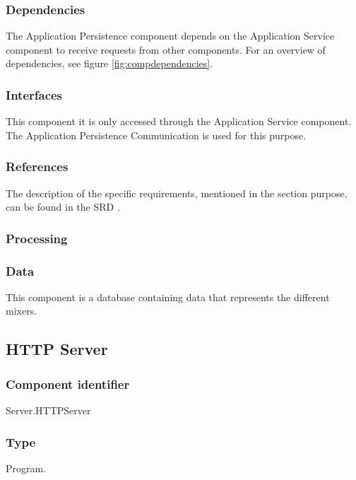 \subsubsection*{Dependencies}
The Application Persistence component depends on the Application Service component to receive requests from other components. For an overview of dependencies, see figure \ref{fig:compdependencies}.

\subsubsection*{Interfaces}
This component it is only accessed through the Application Service component. The Application Persistence Communication is used for this purpose.  

\subsubsection*{References}
The description of the specific requirements, mentioned in the section purpose, can be found in the SRD \cite{srd}.

\subsubsection*{Processing}

\subsubsection*{Data}
This component is a database containing data that represents the different mixers.

\subsection{HTTP Server}

\subsubsection*{Component identifier}
Server.HTTPServer

\subsubsection*{Type}
Program.

